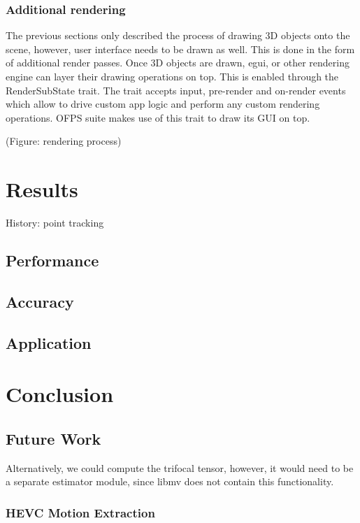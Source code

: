\documentclass[11pt,english]{report}
\begin{document}
\subsection{Additional rendering}

The previous sections only described the process of drawing 3D objects onto the scene, however, user interface needs to be drawn as well. This is done in the form of additional render passes. Once 3D objects are drawn, egui, or other rendering engine can layer their drawing operations on top. This is enabled through the RenderSubState trait. The trait accepts input, pre-render and on-render events which allow to drive custom app logic and perform any custom rendering operations. OFPS suite makes use of this trait to draw its GUI on top.

(Figure: rendering process)

\chapter{Results}

History: point tracking

\section{Performance}

\section{Accuracy}

\section{Application}

\chapter{Conclusion}

\section{Future Work}

Alternatively, we could compute the trifocal tensor\cite{hartley_zisserman_2004}, however, it would need to be a separate estimator module, since libmv does not contain this functionality.

\subsection{HEVC Motion Extraction}
\end{document}
